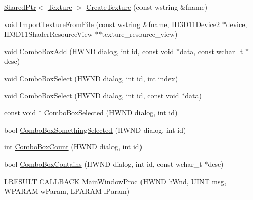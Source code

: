 \begin{DoxyCompactItemize}
\item 
\hyperlink{namespacemage_a1e01ae66713838a7a67d30e44c67703e}{Shared\+Ptr}$<$ \hyperlink{classmage_1_1_texture}{Texture} $>$ \hyperlink{namespacemage_ac27913e621bde0fd01312183aafaaca0}{Create\+Texture} (const wstring \&fname)
\item 
void \hyperlink{namespacemage_a00ef840caba08f9c94c1590a98e3546b}{Import\+Texture\+From\+File} (const wstring \&fname, I\+D3\+D11\+Device2 $\ast$device, I\+D3\+D11\+Shader\+Resource\+View $\ast$$\ast$texture\+\_\+resource\+\_\+view)
\item 
void \hyperlink{namespacemage_a78e4a1d3c21d6eb8657bfa0a9631d6ee}{Combo\+Box\+Add} (H\+W\+ND dialog, int id, const void $\ast$data, const wchar\+\_\+t $\ast$desc)
\item 
void \hyperlink{namespacemage_aa510d1e5e45102338fce66ae46b2b267}{Combo\+Box\+Select} (H\+W\+ND dialog, int id, int index)
\item 
void \hyperlink{namespacemage_a026dd5ecb1cea93f38193f403e878d23}{Combo\+Box\+Select} (H\+W\+ND dialog, int id, const void $\ast$data)
\item 
const void $\ast$ \hyperlink{namespacemage_affa0d91f266dfbe4ed4a29c26b04dcb8}{Combo\+Box\+Selected} (H\+W\+ND dialog, int id)
\item 
bool \hyperlink{namespacemage_afa2451527062c4213d21bdf01b1922c6}{Combo\+Box\+Something\+Selected} (H\+W\+ND dialog, int id)
\item 
int \hyperlink{namespacemage_a5c586938d7f59a82c8528fab41f17960}{Combo\+Box\+Count} (H\+W\+ND dialog, int id)
\item 
bool \hyperlink{namespacemage_a98228034fca63017765bcdf5966be239}{Combo\+Box\+Contains} (H\+W\+ND dialog, int id, const wchar\+\_\+t $\ast$desc)
\item 
L\+R\+E\+S\+U\+LT C\+A\+L\+L\+B\+A\+CK \hyperlink{namespacemage_a7ab7652c75189226bf8299647e897c99}{Main\+Window\+Proc} (H\+W\+ND h\+Wnd, U\+I\+NT msg, W\+P\+A\+R\+AM w\+Param, L\+P\+A\+R\+AM l\+Param)
\end{DoxyCompactItemize}
